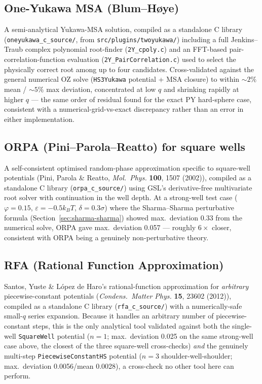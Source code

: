 \documentclass[11pt,a4paper]{article}
\newcommand{\code}[1]{\texttt{#1}}
\begin{document}
\subsection{One-Yukawa MSA (Blum--H\o ye)}
A semi-analytical Yukawa-MSA solution, compiled as a standalone C library
(\code{oneyukawa\_c\_source/}, from \code{src/plugins/twoyukawa/}) including a
full Jenkins--Traub complex polynomial root-finder (\code{2Y\_cpoly.c}) and an
FFT-based pair-correlation-function evaluation (\code{2Y\_PairCorrelation.c})
used to select the physically correct root among up to four candidates.
Cross-validated against the general numerical OZ solve (\code{HS3Yukawa}
potential + MSA closure) to within $\sim2\%$ mean / $\sim5\%$ max deviation,
concentrated at low $q$ and shrinking rapidly at higher $q$ --- the same order
of residual found for the exact PY hard-sphere case, consistent with a
numerical-grid-vs-exact discrepancy rather than an error in either
implementation.

\subsection{ORPA (Pini--Parola--Reatto) for square wells}
A self-consistent optimised random-phase approximation specific to square-well
potentials (Pini, Parola \& Reatto, \emph{Mol.\ Phys.} \textbf{100}, 1507
(2002)), compiled as a standalone C library (\code{orpa\_c\_source/}) using
GSL's derivative-free multivariate root solver with continuation in the well
depth. At a strong-well test case ($\varphi=0.15$, $\varepsilon=-0.5k_BT$,
$\delta=0.3\sigma$) where the Sharma--Sharma perturbative formula
(Section~\ref{sec:sharma-sharma}) showed max.\ deviation 0.33 from the
numerical solve, ORPA gave max.\ deviation 0.057 --- roughly $6\times$ closer,
consistent with ORPA being a genuinely non-perturbative theory.

\subsection{RFA (Rational Function Approximation)}
\label{sec:rfa}
Santos, Yuste \& L\'opez de Haro's rational-function approximation for
\emph{arbitrary} piecewise-constant potentials (\emph{Condens.\ Matter Phys.}
\textbf{15}, 23602 (2012)), compiled as a standalone C library
(\code{rfa\_c\_source/}) with a numerically-safe small-$q$ series expansion.
Because it handles an arbitrary number of piecewise-constant steps, this is
the only analytical tool validated against both the single-well
\code{SquareWell} potential ($n=1$; max.\ deviation 0.025 on the same
strong-well case above, the closest of the three square-well
cross-checks) \emph{and} the genuinely multi-step
\code{PiecewiseConstantHS} potential ($n=3$ shoulder-well-shoulder; max.\
deviation 0.0056/mean 0.0028), a cross-check no other tool here can perform.
\end{document}
